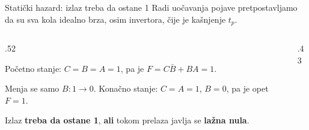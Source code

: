 \begin{frame}[label=02-s051]{Statički hazard: izlaz treba da ostane 1}
\setlength{\parskip}{0pt}
Radi uočavanja pojave pretpostavljamo da su sva kola idealno brza, osim invertora, čije je kašnjenje \(t_p\).
\par\vspace{2mm}
\begin{columns}[T,onlytextwidth]
\begin{column}{.52\textwidth}
{\centering\par}
\par\vspace{2mm}
Početno stanje: \(C=B=A=1\), pa je \(F=C\bar B+BA=1\).
\par\vspace{1mm}
Menja se samo \(B:1\to0\). Konačno stanje: \(C=A=1\), \(B=0\), pa je opet \(F=1\).
\par\vspace{1mm}
Izlaz \textbf{treba da ostane 1}, \alert{\textbf{ali}} tokom prelaza javlja se \alert{\textbf{lažna nula}}.
\end{column}
\begin{column}{.43\textwidth}\centering

\end{column}
\end{columns}
\end{frame}
